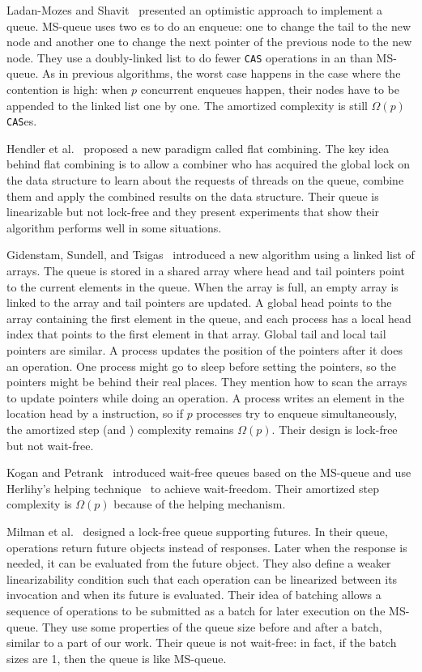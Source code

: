 Ladan-Mozes and Shavit~\cite{DBLP:journals/dc/Ladan-MozesS08}
presented an optimistic approach to implement a queue. MS-queue uses
two es to do an enqueue: one to change the tail to the new
node and another one to change the next pointer of the previous node
to the new node. They use a doubly-linked list to do fewer
\texttt{CAS} operations in an  than MS-queue. As in
previous algorithms, the worst case happens in the case where the
contention is high: when $p$ concurrent enqueues happen, their nodes
have to be appended to the linked list one by one. The amortized
complexity is still $\Omega(p)$ \texttt{CAS}es. 

Hendler et al.~\cite{DBLP:conf/spaa/HendlerIST10} proposed a new
paradigm called flat combining. The key idea behind flat combining is
to allow a combiner who has acquired the global lock on the data
structure to learn about the requests of threads on the queue, combine
them and apply the combined results on the data structure. Their queue
is linearizable but not lock-free and they present experiments that
show their algorithm performs well in some situations. 

Gidenstam, Sundell, and Tsigas~\cite{DBLP:conf/opodis/GidenstamST10}
introduced a new algorithm using a linked list of arrays. The queue is
stored in a shared array where head and tail pointers point to the
current elements in the queue. When the array is full, an empty array
is linked to the array and tail pointers are updated. A global head
points to the array containing the first element in the queue, and
each process has a local head index that points to the first element
in that array. Global tail and local tail pointers are similar. A
process updates the position of the pointers after it does an
operation. One process might go to sleep before setting the pointers,
so the pointers might be behind their real places. They mention how to
scan the arrays to update pointers while doing an operation. A process
writes an element in the location head by a  instruction, so
if $p$ processes try to enqueue simultaneously, the amortized step
(and ) complexity remains $\Omega(p)$. Their design is
lock-free but not wait-free. 

Kogan and Petrank~\cite{DBLP:conf/ppopp/KoganP11} introduced wait-free
queues based on the MS-queue and use Herlihy's helping
technique~\cite{10.1145/114005.102808} to achieve wait-freedom. Their
amortized step complexity is $\Omega(p)$ because of the helping
mechanism. 

Milman et al.~\cite{DBLP:conf/spaa/MilmanKLLP18} designed a lock-free
queue supporting futures. In their queue, operations  return future
objects instead of responses. Later when the response is needed, it
can be evaluated from the future object. They also define a weaker
linearizability condition such that each operation can be linearized
between its invocation and when its future is evaluated. Their idea of
batching allows a sequence of operations to be submitted as a batch
for later execution on the MS-queue. They use some properties of the
queue size before and after a batch, similar to a part of our
work. Their queue is not wait-free: in fact, if the batch sizes are 1,
then the queue is like MS-queue. 


